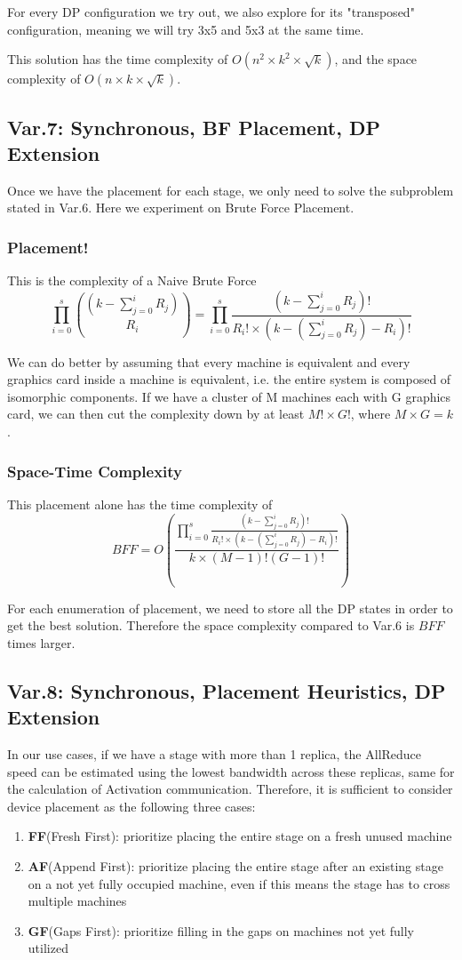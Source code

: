 \documentclass[12pt,letterpaper]{article}
\begin{document}
For every DP configuration we try out, we also explore for its "transposed" configuration, meaning we will try 3x5 and 5x3 at the same time. 

This solution has the time complexity of $O(n^2\times k^2\times \sqrt{k})$, and the space complexity of $O(n \times k \times \sqrt{k})$.

\subsection{Var.7: Synchronous, BF Placement, DP Extension}
Once we have the placement for each stage, we only need to solve the subproblem stated in Var.6. Here we experiment on Brute Force Placement.

\subsubsection{Placement!}
This is the complexity of a Naive Brute Force $$\prod_{i=0}^s {(k - \sum_{j=0}^i {R_j}) \choose R_i} = \prod_{i=0}^s \frac{(k - \sum_{j=0}^i {R_j})!}{R_i ! \times (k - (\sum_{j=0}^i {R_j}) - R_i)!}$$

We can do better by assuming that every machine is equivalent and every graphics card inside a machine is equivalent, i.e. the entire system is composed of isomorphic components. If we have a cluster of M machines each with G graphics card, we can then cut the complexity down by at least $M! \times G!$, where $M\times G = k$.

\subsubsection{Space-Time Complexity}
This placement alone has the time complexity of 
$$BFF = O(\frac{\prod_{i=0}^s \frac{(k - \sum_{j=0}^i {R_j})!}{R_i ! \times (k - (\sum_{j=0}^i {R_j}) - R_i)!}}{k \times (M-1)!(G-1)!})$$

For each enumeration of placement, we need to store all the DP states in order to get the best solution. Therefore the space complexity compared to Var.6 is $BFF$ times larger.

\subsection{Var.8: Synchronous, Placement Heuristics, DP Extension}
In our use cases, if we have a stage with more than 1 replica, the AllReduce speed can be estimated using the lowest bandwidth across these replicas, same for the calculation of Activation communication. Therefore, it is sufficient to consider device placement as the following three cases:
\begin{enumerate}
	\item \textbf{FF}(Fresh First): prioritize placing the entire stage on a fresh unused machine
	\item \textbf{AF}(Append First): prioritize placing the entire stage after an existing stage on a not yet fully occupied machine, even if this means the stage has to cross multiple machines
	\item \textbf{GF}(Gaps First): prioritize filling in the gaps on machines not yet fully utilized
\end{enumerate}
\end{document}
